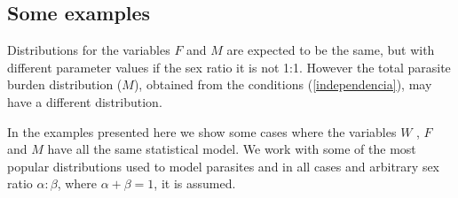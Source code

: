 \documentclass[12pt,a4paper]{article}
\theoremstyle{plain}%
\theoremstyle{definition}
\theoremstyle{remark}
\begin{document}
	
\subsection{Some examples}

Distributions for the variables $F$ and $M$ are expected to be the same, but with different parameter values if the sex ratio it is not 1:1. However the total parasite burden distribution ($M$), obtained from the conditions (\ref{independencia}), may have a different distribution. 

	
	
	In the examples presented here we show some cases where the variables $W$ , $F$ and $M$ have all the same statistical model.
	We work with some of the most popular distributions	used to model parasites and in all cases and arbitrary sex ratio $\alpha:\beta$, where $\alpha+\beta=1$, it is assumed. 
	
\end{document}
